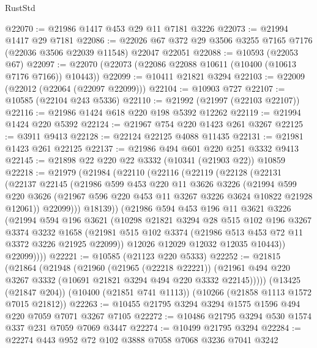 \begin{lexlean}{RustStd}
\begin{coremodule}
@22070 := @21986 @1417 @453 @29 @11 @7181 @3226
@22073 := @21994 @1417 @29 @7181
@22086 := @22026 @67 @372 @29 @3506 @3255 @7165 @7176 (@22036 @3506 @22039 @11548) @22047 @22051
@22088 := @10593 (@22053 @67)
@22097 := @22070 (@22073 (@22086 @22088 @10611 (@10400 (@10613 @7176 @7166)) @10443))
@22099 := @10411 @21821 @3294
@22103 := @22009 (@22012 (@22064 (@22097 @22099)))
@22104 := @10903 @727
@22107 := @10585 (@22104 @243 @5336)
@22110 := @21992 (@21997 (@22103 @22107))
@22116 := @21986 @1424 @618 @220 @198 @5392 @12262
@22119 := @21994 @1424 @220 @5392
@22124 := @21967 @754 @220 @1423 @261 @3267
@22125 := @3911 @9413
@22128 := @22124 @22125 @4088 @11435
@22131 := @21981 @1423 @261 @22125
@22137 := @21986 @494 @601 @220 @251 @3332 @9413
@22145 := @21898 @22 @220 @22 @3332 (@10341 (@21903 @22)) @10859
@22218 := @21979
    (@21984
      (@22110
        (@22116
          (@22119
            (@22128
              (@22131
                (@22137
                  @22145
                  (@21986
                    @599
                    @453
                    @220
                    @11
                    @3626
                    @3226
                    (@21994
                      @599
                      @220
                      @3626
                      (@21967 @596 @220 @453 @11 @3267 @3226 @3624 @10822 @21928 @12061))
                    @22099)))
              @18139))
          (@21986
            @594
            @453
            @196
            @11
            @3621
            @3226
            (@21994
              @594
              @196
              @3621
              (@10298
                @21821
                @3294
                @28
                @515
                @102
                @196
                @3267
                @3374
                @3232
                @1658
                (@21981 @515 @102 @3374 (@21986 @513 @453 @72 @11 @3372 @3226 @21925 @22099))
                @12026
                @12029
                @12032
                @12035
                @10443))
            @22099))))
@22221 := @10585 (@21123 @220 @5333)
@22252 := @21815
    (@21864
      (@21948
        (@21960
          (@21965 (@22218 @22221))
          (@21961 @494 @220 @3267 @3332 (@10691 @21821 @3294 @494 @220 @3332 @22145)))))
    (@13425 (@21847 @204))
    (@10400 (@21851 @741 @1113))
    (@10266 (@21858 @1113 @1572 @7015 @21812))
@22263 := @10455 @21795 @3294 @3294 @1575 @1596 @494 @220 @7059 @7071 @3267 @7105
@22272 := @10486 @21795 @3294 @530 @1574 @337 @231 @7059 @7069 @3447
@22274 := @10499 @21795 @3294
@22284 := @22274 @443 @952 @72 @102 @3888 @7058 @7068 @3236 @7041 @3242

\end{coremodule}
\end{lexlean}
